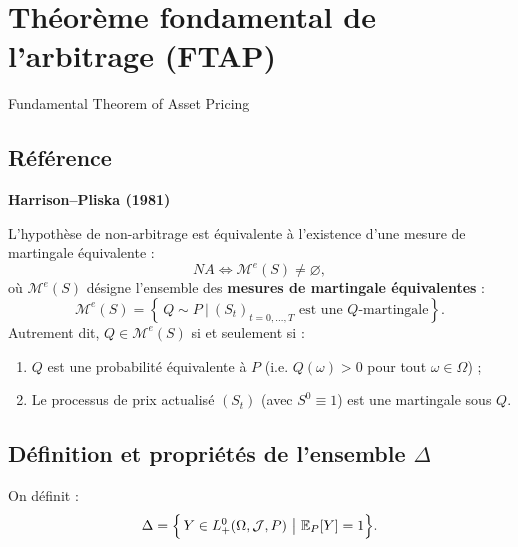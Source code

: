 \chapter{Théorème fondamental de l'arbitrage (FTAP)}

Fundamental Theorem of Asset Pricing

\section{Référence}
\textbf{Harrison--Pliska (1981)}

\begin{theoreme}
L'hypothèse de non-arbitrage est équivalente à l'existence d'une mesure de martingale équivalente :
\begin{equation}
NA \Longleftrightarrow \mathcal{M}^e(S) \neq \varnothing,
\end{equation}
où $\mathcal{M}^e(S)$ désigne l'ensemble des \textbf{mesures de martingale équivalentes} :
\begin{equation}
\mathcal{M}^e(S) = \left\{\, Q \sim P \ \Big|\ (S_t)_{t=0,\dots,T} \text{ est une } Q\text{-martingale} \right\}.
\end{equation}
Autrement dit, $Q \in \mathcal{M}^e(S)$ si et seulement si :
\begin{enumerate}
    \item $Q$ est une probabilité équivalente à $P$ (i.e. $Q(\omega) > 0$ pour tout $\omega \in \Omega$) ;
    \item Le processus de prix actualisé $(S_t)$ (avec $S^0 \equiv 1$) est une martingale sous $Q$.
\end{enumerate}
\end{theoreme}

\section{Définition et propriétés de l'ensemble $\Delta$}

\begin{definition}
On définit :
\begin{equation}
\Delta = \Bigl\{\, Y \in L_+^0(\Omega, \mathcal{J}, P) \ \big|\ \mathbb{E}_P[Y] = 1 \Bigr\}.
\end{equation}
\end{definition}

